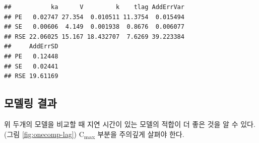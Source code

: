 \documentclass[
  11pt,
  krantz2, a4paper, twoside]{krantz}
\newenvironment{Shaded}{\begin{snugshade}}{\end{snugshade}}
\newcommand{\AttributeTok}[1]{\textcolor[rgb]{0.77,0.63,0.00}{#1}}
\newcommand{\DecValTok}[1]{\textcolor[rgb]{0.00,0.00,0.81}{#1}}
\newcommand{\FloatTok}[1]{\textcolor[rgb]{0.00,0.00,0.81}{#1}}
\newcommand{\FunctionTok}[1]{\textcolor[rgb]{0.00,0.00,0.00}{#1}}
\newcommand{\NormalTok}[1]{#1}
\newcommand{\OtherTok}[1]{\textcolor[rgb]{0.56,0.35,0.01}{#1}}
\newcommand{\SpecialCharTok}[1]{\textcolor[rgb]{0.00,0.00,0.00}{#1}}
\newcommand{\StringTok}[1]{\textcolor[rgb]{0.31,0.60,0.02}{#1}}
\theoremstyle{definition}
\theoremstyle{definition}
\theoremstyle{definition}
\theoremstyle{definition}
\theoremstyle{remark}
\begin{document}
\begin{verbatim}
##           ka      V         k    tlag AddErrVar
## PE   0.02747 27.354  0.010511 11.3754  0.015494
## SE   0.00606  4.149  0.001938  0.8676  0.006077
## RSE 22.06025 15.167 18.432707  7.6269 39.223384
##     AddErrSD
## PE   0.12448
## SE   0.02441
## RSE 19.61169
\end{verbatim}

\hypertarget{uxbaa8uxb378uxb9c1-uxacb0uxacfc}{%
\subsection{모델링 결과}\label{uxbaa8uxb378uxb9c1-uxacb0uxacfc}}

위 두개의 모델을 비교할 때 지연 시간이 있는 모델의 적합이 더 좋은 것을 알 수 있다. (그림 \ref{fig:onecomp-lag}) C\textsubscript{max} 부분을 주의깊게 살펴야 한다. 

\begin{Shaded}
\end{Shaded}
\end{document}
